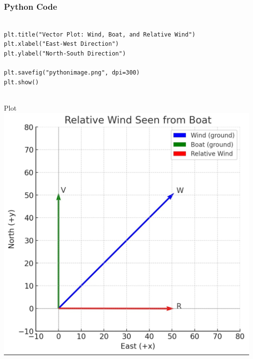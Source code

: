 \documentclass{beamer}
\begin{document}
\begin{frame}[fragile]
    \frametitle{Python Code}
    \begin{lstlisting}

plt.title("Vector Plot: Wind, Boat, and Relative Wind")
plt.xlabel("East-West Direction")
plt.ylabel("North-South Direction")

plt.savefig("pythonimage.png", dpi=300)
plt.show()


    \end{lstlisting}
\end{frame}


\begin{frame}{Plot}
    \centering
    \includegraphics[width=\columnwidth, height=0.8\textheight, keepaspectratio]{figs/python image.png}     
\end{frame}
\end{document}

